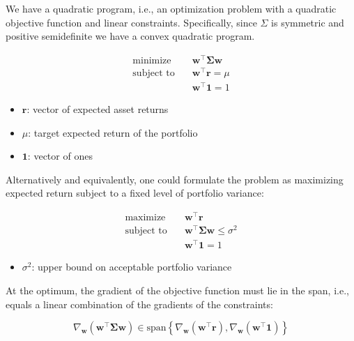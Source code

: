 \vspace{0.27cm} We have a quadratic program, i.e., an optimization problem with a quadratic objective function and linear constraints. Specifically, since $\Sigma$ is symmetric and positive semidefinite we have a convex quadratic program. 

\[
\begin{aligned}
\text{minimize} \quad & \mathbf{w}^\top \boldsymbol{\Sigma} \mathbf{w} \\
\text{subject to} \quad & \mathbf{w}^\top \mathbf{r} = \mu \\
                        & \mathbf{w}^\top \mathbf{1} = 1
\end{aligned}
\]


\begin{itemize}
  \item[] $\mathbf{r}$: vector of expected asset returns  
  \item[] $\mu$: target expected return of the portfolio  
  \item[] $\mathbf{1}$: vector of ones 
\end{itemize}


\vspace{0.27cm} Alternatively and equivalently, one could formulate the problem as maximizing expected return subject to a fixed level of portfolio variance: 

\[
\begin{aligned}
\text{maximize} \quad & \mathbf{w}^\top \mathbf{r} \\
\text{subject to} \quad & \mathbf{w}^\top \boldsymbol{\Sigma} \mathbf{w} \leq \sigma^2 \\
                        & \mathbf{w}^\top \mathbf{1} = 1
\end{aligned}
\]

\begin{itemize}
  \item[] $\sigma^2$: upper bound on acceptable portfolio variance
\end{itemize}


\vspace{0.27cm} At the optimum, the gradient of the objective function must lie in the span, i.e., equals a linear combination of the gradients of the constraints:

\[
\nabla_{\mathbf{w}} \left( \mathbf{w}^\top \boldsymbol{\Sigma} \mathbf{w} \right)
\in \mathrm{span} \left\{ \nabla_{\mathbf{w}} \left( \mathbf{w}^\top \mathbf{r} \right), \nabla_{\mathbf{w}} \left( \mathbf{w}^\top \mathbf{1} \right) \right\}
\]

